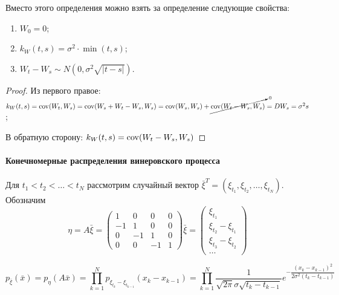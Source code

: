 \begin{utv}
  Вместо этого определения можно взять за определение следующие свойства:
  \begin{enumerate}
    \item $W_0 = 0$;
    \item $k_W(t, s) = \sigma^2 \cdot \min(t, s)$;
    \item $W_t - W_s \sim N(0, \sigma^2 \sqrt{|t-s|})$.
  \end{enumerate}
\end{utv}
\begin{proof}
  Из первого правое:
  $k_W(t,s) = \operatorname{cov}(W_t, W_s) = \operatorname{cov}(W_s + W_t - W_s, W_s) = \operatorname{cov}(W_s, W_s) + \cancelto{0}{\operatorname{cov}(W_t - W_s, W_s)}
  = DW_s = \sigma^2 s$;

  В обратную сторону:
  $k_W(t, s) = \operatorname{cov}(W_t - W_s, W_s)$
\end{proof}

\paragraph{Конечномерные распределения винеровского процесса}

Для $t_1 < t_2 < \dots < t_N$ рассмотрим случайный вектор $\bar{\xi}^T = (\xi_{t_1}, \xi_{t_2}, \dots, \xi_{t_N})$. Обозначим
\[
  \eta = A\bar{\xi} = \begin{pmatrix}
    1 & 0 & 0 & 0 \\
    -1 & 1 & 0 & 0 \\
    0 & -1 & 1 & 0 \\
    0 & 0 & -1 & 1
    \end{pmatrix} \bar{\xi} = \begin{pmatrix}
    \xi_{t_1} \\
    \xi_{t_2} - \xi_{t_1} \\
    \xi_{t_3} - \xi_{t_2} \\
    \dots
  \end{pmatrix}
\]

\[
  p_{\bar{\xi}}(\bar{x}) = p_{\eta} (A\bar{x}) = \prod_{k=1}^{N} p_{\xi_{t_k} - \xi_{t_{k-1}}} (x_k - x_{k-1})
  = \prod_{k=1}^{N} \dfrac{1}{\sqrt{2\pi} \sigma \sqrt{t_k - t_{k-1}}} e^{- \dfrac{(x_k - x_{k-1})^2}{2\sigma^2 (t_k - t_{k-1})}}
\]

